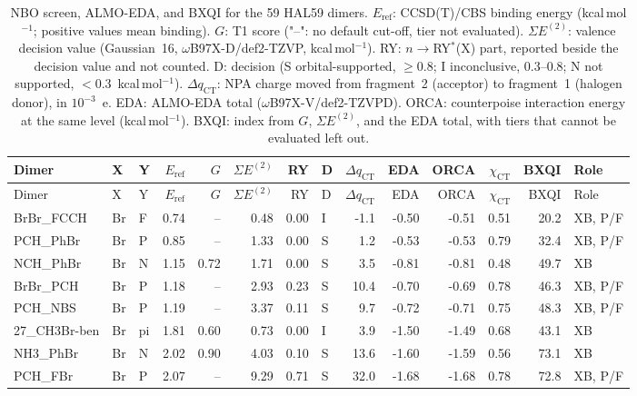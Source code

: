 \documentclass[journal=jcisd8,manuscript=suppinfo]{achemso}
\begin{document}
\begin{singlespace}
{\scriptsize
\setlength{\tabcolsep}{3pt}
\begin{longtable}{lllrrrrlrrrrrl}
\caption{NBO screen, ALMO-EDA, and BXQI for the 59 HAL59 dimers. $E_\mathrm{ref}$: CCSD(T)/CBS binding energy (kcal\,mol$^{-1}$; positive values mean binding). $G$: T1 score ("--": no default cut-off, tier not evaluated). $\Sigma E^{(2)}$: valence decision value (Gaussian~16, $\omega$B97X-D/def2-TZVP, kcal\,mol$^{-1}$). RY: $n\to$RY$^*$(X) part, reported beside the decision value and not counted. D: decision (S orbital-supported, $\ge 0.8$; I inconclusive, 0.3--0.8; N not supported, $<0.3$~kcal\,mol$^{-1}$). $\Delta q_\mathrm{CT}$: NPA charge moved from fragment~2 (acceptor) to fragment~1 (halogen donor), in $10^{-3}$~e. EDA: ALMO-EDA total ($\omega$B97X-V/def2-TZVPD). ORCA: counterpoise interaction energy at the same level (kcal\,mol$^{-1}$). BXQI: index from $G$, $\Sigma E^{(2)}$, and the EDA total, with tiers that cannot be evaluated left out.}\label{tab:qmhal}\\
\toprule
Dimer & X & Y & $E_\mathrm{ref}$ & $G$ & $\Sigma E^{(2)}$ & RY & D & $\Delta q_\mathrm{CT}$ & EDA & ORCA & $\chi_\mathrm{CT}$ & BXQI & Role\\
\midrule
\endfirsthead
\toprule
Dimer & X & Y & $E_\mathrm{ref}$ & $G$ & $\Sigma E^{(2)}$ & RY & D & $\Delta q_\mathrm{CT}$ & EDA & ORCA & $\chi_\mathrm{CT}$ & BXQI & Role\\
\midrule
\endhead
\bottomrule
\endlastfoot
BrBr\_FCCH & Br & F & 0.74 & -- & 0.48 & 0.00 & I & -1.1 & -0.50 & -0.51 & 0.51 & 20.2 & XB, P/F\\
PCH\_PhBr & Br & P & 0.85 & -- & 1.33 & 0.00 & S & 1.2 & -0.53 & -0.53 & 0.79 & 32.4 & XB, P/F\\
NCH\_PhBr & Br & N & 1.15 & 0.72 & 1.71 & 0.00 & S & 3.5 & -0.81 & -0.81 & 0.48 & 49.7 & XB\\
BrBr\_PCH & Br & P & 1.18 & -- & 2.93 & 0.23 & S & 10.4 & -0.70 & -0.69 & 0.78 & 46.3 & XB, P/F\\
PCH\_NBS & Br & P & 1.19 & -- & 3.37 & 0.11 & S & 9.7 & -0.72 & -0.71 & 0.75 & 48.3 & XB, P/F\\
27\_CH3Br-ben & Br & pi & 1.81 & 0.60 & 0.73 & 0.00 & I & 3.9 & -1.50 & -1.49 & 0.68 & 43.1 & XB\\
NH3\_PhBr & Br & N & 2.02 & 0.90 & 4.03 & 0.10 & S & 13.6 & -1.60 & -1.59 & 0.56 & 73.1 & XB\\
PCH\_FBr & Br & P & 2.07 & -- & 9.29 & 0.71 & S & 32.0 & -1.68 & -1.68 & 0.78 & 72.8 & XB, P/F\\

\end{longtable}}
\end{singlespace}
\end{document}
